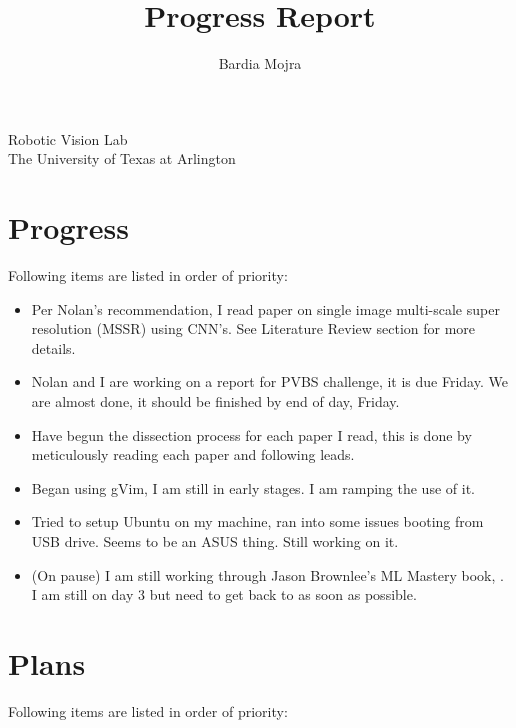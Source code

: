 \documentclass[11pt]{article}
\title{Progress Report}
\author{Bardia Mojra}
\begin{document}
\maketitle
\thispagestyle{empty}

\begin{center}
	\bigskip
	\bigskip
	Robotic Vision Lab \\
	The University of Texas at Arlington\\
\end{center}

\newpage

\section{Progress}
Following items are listed in order of priority:
\begin{itemize}

	\item Per Nolan's recommendation, I read paper \cite{MSSRwCNN} on single image multi-scale super resolution (MSSR) using CNN's. See Literature Review section for more details.

	\item Nolan and I are working on a report for PVBS challenge, it is due Friday. We are almost done, it should be finished by end of day, Friday.

	\item Have begun the dissection process for each paper I read, this is done by meticulously reading each paper and following leads.

	\item Began using gVim, I am still in early stages. I am ramping the use of it.

	\item Tried to setup Ubuntu on my machine, ran into some issues booting from USB drive. Seems to be an ASUS thing. Still working on it.

	\item (On pause) I am still working through Jason Brownlee's ML Mastery book, \cite{MLmasteryPy}. I am still on day 3 but need to get back to as soon as possible.


\end{itemize}

\section{Plans}
Following items are listed in order of priority:
\end{document}
